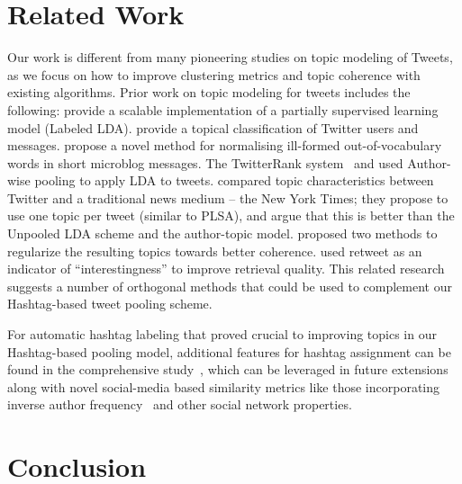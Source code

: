 \documentclass{sig-alternate}
\newcommand{\secmoveup}{\vspace{-1.mm}}
\begin{document}
\section{Related Work}

\label{sec:related_work}

Our work is different from many pioneering studies
on topic modeling of Tweets, as we focus on how to
improve clustering metrics and topic coherence with existing algorithms.
Prior work on topic modeling for tweets includes the following:
\cite{ramage} provide a scalable implementation of a partially
supervised learning model (Labeled LDA).
\cite{hong} provide a topical classification of
Twitter users and messages.
\cite{han2012tist} propose a novel method for normalising
ill-formed out-of-vocabulary words in short microblog messages.  The
{T}witterRank system~\cite{Weng2010wsdm} and \cite{hong} used 
Author-wise pooling to apply LDA to tweets. \cite{wayne} compared
topic characteristics between Twitter and a traditional news 
medium -- the New York Times; they
propose to use one topic per tweet (similar to PLSA), and argue that
this is better than the Unpooled LDA scheme and the author-topic model.
\cite{newman11} proposed two methods to regularize the
resulting topics towards better coherence.
\cite{Naveed2011cikm} %
used retweet as an indicator of ``interestingness'' to improve retrieval
quality.  This related research suggests a number of orthogonal
methods that could be used to complement our Hashtag-based 
tweet pooling scheme.

For automatic hashtag labeling that proved crucial to improving topics
in our Hashtag-based pooling model, additional features for hashtag
assignment can be found in the comprehensive study~\cite{yang2012www},
which can be leveraged in future extensions along with novel 
social-media based similarity metrics like those incorporating inverse
author frequency~\cite{iaf} and other social network properties. 

\secmoveup
\section{Conclusion}
\end{document}
